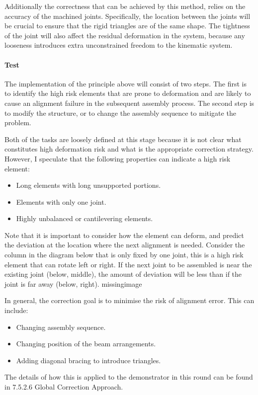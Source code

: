 Additionally the correctness that can be achieved by this method, relies on the accuracy of the machined joints. Specifically, the location between the joints will be crucial to ensure that the rigid triangles are of the same shape. The tightness of the joint will also affect the residual deformation in the system, because any looseness introduces extra unconstrained freedom to the kinematic system. 

\paragraph{Test}
The implementation of the principle above will consist of two steps. The first is to identify the high risk elements that are prone to deformation and are likely to cause an alignment failure in the subsequent assembly process. The second step is to modify the structure, or to change the assembly sequence to mitigate the problem.

Both of the tasks are loosely defined at this stage because it is not clear what constitutes high deformation risk and what is the appropriate correction strategy. However, I speculate that the following properties can indicate a high risk element:
\begin{itemize}
    \item Long elements with long unsupported portions.
    \item Elements with only one joint.
    \item Highly unbalanced or cantilevering elements.
\end{itemize}
Note that it is important to consider how the element can deform, and predict the deviation at the location where the next alignment is needed. Consider the column in the diagram below that is only fixed by one joint, this is a high risk element that can rotate left or right. If the next joint to be assembled is near the existing joint (below, middle), the amount of deviation will be less than if the joint is far away (below, right). 
missingimage

In general, the correction goal is to minimise the risk of alignment error. This can include:
\begin{itemize}
    \item Changing assembly sequence.
    \item Changing position of the beam arrangements.
    \item Adding diagonal bracing to introduce triangles.
\end{itemize}
The details of how this is applied to the demonstrator in this round can be found in 7.5.2.6 Global Correction Approach.

